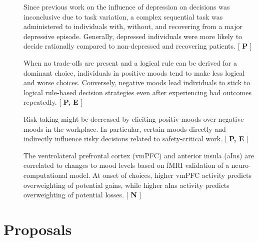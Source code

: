 \documentclass[12pt,a4paper]{article}
\newcommand{\categorization}[1]{[ \textbf{ #1 } ]}
\begin{document}
\begin{description}
  \item[\textcite{VonHelversen2011}] Since previous work on the influence of
depression on decisions was inconclusive due to task variation, a complex
sequential task was administered to individuals with, without, and recovering
from a major depressive episode. Generally, depressed individuals were more
likely to decide rationally compared to non-depressed and recovering patients.
\categorization{P}

  \item[\textcite{DeVries2012}] When no trade-offs are present and a logical rule
can be derived for a dominant choice, individuals in positive moods tend to
make less logical and worse choices. Conversely, negative moods lead
individuals to stick to logical rule-based decision strategies even after
experiencing bad outcomes repeatedly.  \categorization{P, E}

  \item[\textcite{Morgan2013}] Risk-taking might be decreased by eliciting positiv
moods over negative moods in the workplace. In particular, certain moods
directly and indirectly influence risky decisions related to safety-critical
work. \categorization{P, E}

  \item[\textcite{Vinckier2018}] The ventrolateral prefrontal cortex (vmPFC) and anterior
insula (aIns) are correlated to changes to mood levels based on fMRI validation of
a neuro-computational model. At onset of choices, higher vmPFC activity
predicts overweighting of potential gains, while higher aIns activity predicts
overweighting of potential losses. \categorization{N}

\end{description}

\section*{Proposals}
\end{document}
